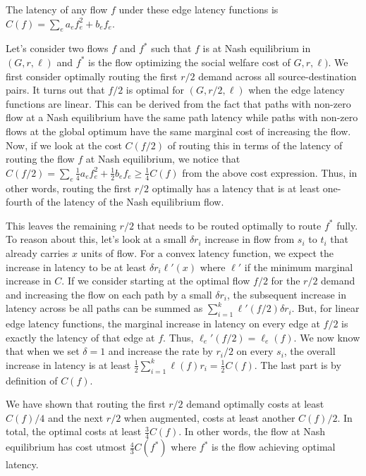\begin{proof-sketch}
    The latency of any flow $f$ under these edge latency functions is $C(f) = \displaystyle \sum_e a_ef^2_e + b_ef_e$.

    Let's consider two flows $f$ and $f^*$ such that $f$ is at Nash equilibrium in $(G, r, \ell)$ and $f^*$ is the flow optimizing the social welfare cost of $G,r,\ell)$. We first consider optimally routing the first $r/2$ demand 
    across all source-destination pairs. It turns out that $f/2$ is optimal for $(G, r/2,\ell)$ when the edge latency functions are linear. This can be derived from the fact that paths with
    non-zero flow at a Nash equilibrium have the same path latency while paths with non-zero flows at the global optimum have the same marginal cost of increasing the flow. Now, if we look at the cost
    $C(f/2)$ of routing this in terms of the latency of routing the flow $f$ at Nash equilibrium, we notice that $C(f/2) = \displaystyle \sum_e \frac{1}{4}a_ef^2_e + \frac{1}{2}b_ef_e \geq \frac{1}{4}C(f)$
    from the above cost expression. Thus, in other words, routing the first $r/2$ optimally has a latency that is at least one-fourth of the latency of the Nash equilibrium flow.

    This leaves the remaining $r/2$ that needs to be routed optimally to route $f^*$ fully. To reason about this, let's look at a small $\delta r_i$ increase in flow from $s_i$ to $t_i$ that already carries $x$ units 
    of flow. For a convex latency function, we expect the increase in latency to be at least $\delta r_i\ell'(x)$ where $\ell'$ if the minimum marginal increase in $C$. If we consider starting at the 
    optimal flow $f/2$ for the $r/2$ demand and increasing the flow on each path by a small $\delta r_i$, the subsequent increase in 
    latency across be all paths can be summed as  $\displaystyle \sum_{i = 1}^k\ell'(f/2)\delta r_i$. But, for linear edge latency functions, the marginal increase in latency on every edge at $f/2$ is exactly
    the latency of that edge at $f$. Thus, $\ell_e'(f/2) = \ell_e(f)$. We now know that when we set $\delta = 1$ and increase the rate by $r_i/2$ on every $s_i$, the overall increase in latency is at least $\displaystyle \frac{1}{2}\sum_{i= 1}^k\ell(f)r_i = \frac{1}{2}C(f)$. The last part is by definition of $C(f)$. 
    
    We have shown that routing the first $r/2$ demand optimally costs at least $C(f)/4$ and the next $r/2$ when augmented, costs at least another $C(f)/2$. In total, the optimal costs at least $\frac{3}{4}C(f)$. In other words,
    the flow at Nash equilibrium has cost utmost $\frac{4}{3}C(f^*)$ where $f^*$ is the flow achieving optimal latency.
\end{proof-sketch}
